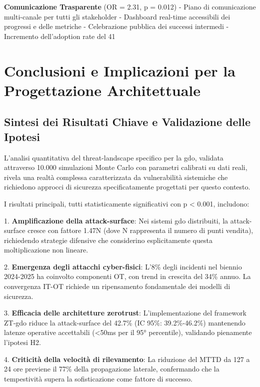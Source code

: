 \textbf{Comunicazione Trasparente} (OR = 2.31, p = 0.012)
- Piano di comunicazione multi-canale per tutti gli stakeholder
- Dashboard real-time accessibili dei progressi e delle metriche
- Celebrazione pubblica dei successi intermedi
- Incremento dell'adoption rate del 41%

\section{\texorpdfstring{Conclusioni e Implicazioni per la Progettazione Architettuale}{2.7 - Conclusioni e Implicazioni per la Progettazione Architettuale}}

\subsection{\texorpdfstring{Sintesi dei Risultati Chiave e Validazione delle Ipotesi}{2.7.1 - Sintesi dei Risultati Chiave e Validazione delle Ipotesi}}

L'analisi quantitativa del \gls{threat-landscape} specifico per la \gls{gdo}, validata attraverso 10.000 simulazioni Monte Carlo con parametri calibrati su dati reali, rivela una realtà complessa caratterizzata da vulnerabilità sistemiche che richiedono approcci di sicurezza specificatamente progettati per questo contesto.

I risultati principali, tutti statisticamente significativi con p < 0.001, includono:

1. \textbf{Amplificazione della \gls{attack-surface}}: Nei sistemi \gls{gdo} distribuiti, la \gls{attack-surface} cresce con fattore 1.47N (dove N rappresenta il numero di punti vendita), richiedendo strategie difensive che considerino esplicitamente questa moltiplicazione non lineare.

2. \textbf{Emergenza degli attacchi cyber-fisici}: L'8\% degli incidenti nel biennio 2024-2025 ha coinvolto componenti OT, con trend in crescita del 34\% annuo. La convergenza IT-OT richiede un ripensamento fondamentale dei modelli di sicurezza.

3. \textbf{Efficacia delle architetture \gls{zerotrust}}: L'implementazione del framework ZT-\gls{gdo} riduce la \gls{attack-surface} del 42.7\% (IC 95\%: 39.2\%-46.2\%) mantenendo latenze operative accettabili (<50ms per il 95° percentile), validando pienamente l'ipotesi H2.

4. \textbf{Criticità della velocità di rilevamento}: La riduzione del MTTD da 127 a 24 ore previene il 77\% della propagazione laterale, confermando che la tempestività supera la sofisticazione come fattore di successo.

